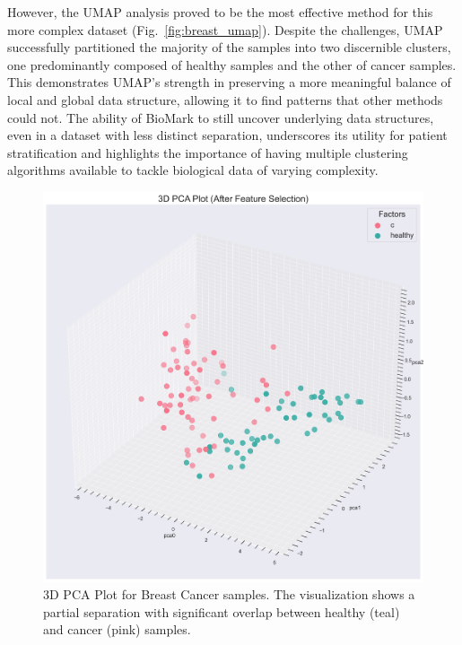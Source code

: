 \documentclass[journal]{IEEEtran}
\begin{document}
However, the UMAP analysis proved to be the most effective method for this more complex dataset (Fig.~\ref{fig:breast_umap}). Despite the challenges, UMAP successfully partitioned the majority of the samples into two discernible clusters, one predominantly composed of healthy samples and the other of cancer samples. This demonstrates UMAP's strength in preserving a more meaningful balance of local and global data structure, allowing it to find patterns that other methods could not. The ability of BioMark to still uncover underlying data structures, even in a dataset with less distinct separation, underscores its utility for patient stratification and highlights the importance of having multiple clustering algorithms available to tackle biological data of varying complexity.


\begin{figure}[htbp]
\centering
\includegraphics[width=\linewidth]{breast_cancer_figures/clustering/after_feature_selection/3D_pca_plot.png}
\caption{3D PCA Plot for Breast Cancer samples. The visualization shows a partial separation with significant overlap between healthy (teal) and cancer (pink) samples.}
\label{fig:breast_pca}
\end{figure}
\end{document}
